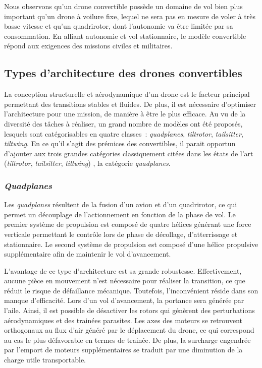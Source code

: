     Nous observons qu'un drone convertible possède un domaine de vol bien plus important qu'un drone à voilure fixe, lequel ne sera pas en mesure de voler à très basse vitesse et qu'un quadrirotor, dont l'autonomie va être limitée par sa consommation.
    En alliant autonomie et vol stationnaire, le modèle convertible répond aux exigences des missions civiles et militaires.

    \subsection{Types d'architecture des drones convertibles}
    La conception structurelle et aérodynamique d'un drone est le facteur principal permettant des transitions stables et fluides. De plus, il est nécessaire d'optimiser l'architecture pour une mission, de manière à être le plus efficace. Au vu de la diversité des tâches à réaliser, un grand nombre de modèles ont été proposés, lesquels sont catégorisables en quatre classes : \textit{quadplanes}, \textit{tiltrotor}, \textit{tailsitter}, \textit{tiltwing}. 
    En ce qu'il s'agit des prémices des convertibles, il parait opportun d'ajouter aux trois grandes catégories classiquement citées dans les états de l'art (\textit{tiltrotor}, \textit{tailsitter}, \textit{tiltwing}) \cite{saeed_survey_2018,ducard_review_2021}, la catégorie \textit{quadplanes}.

        \subsubsection*{\textit{Quadplanes}}
        Les \textit{quadplanes} résultent de la fusion d'un avion et d'un quadrirotor, ce qui permet un découplage de l'actionnement en fonction de la phase de vol. Le premier système de propulsion est composé de quatre hélices générant une force verticale permettant le contrôle lors de phase de décollage, d'atterrissage et stationnaire. Le second système de propulsion est composé d'une hélice propulsive supplémentaire afin de maintenir le vol d'avancement.

        L'avantage de ce type d'architecture est sa grande robustesse. Effectivement, aucune pièce en mouvement n'est nécessaire pour réaliser la transition, ce que réduit le risque de défaillance mécanique. Toutefois, l'inconvénient réside dans son manque d'efficacité. Lors d'un vol d'avancement, la portance sera générée par l'aile. Ainsi, il est possible de désactiver les rotors qui génèrent des perturbations aérodynamiques et des trainées parasites. Les axes des moteurs se retrouvent orthogonaux au flux d'air généré par le déplacement du drone, ce qui correspond au cas le plus défavorable en termes de trainée. De plus, la surcharge engendrée par l'emport de moteurs supplémentaires se traduit par une diminution de la charge utile transportable. 

